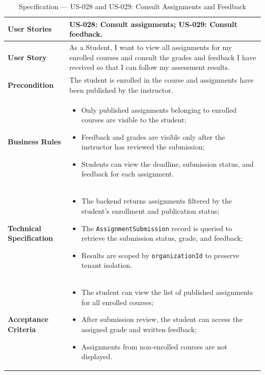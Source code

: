 \begin{table}[H]
\centering
\caption{Specification — US-028 and US-029: Consult Assignments and Feedback}
\label{tab:us028}
\renewcommand{\arraystretch}{1.2}
\begin{tabularx}{\textwidth}{|p{3.5cm}|X|}
\hline
\textbf{User Stories} & US-028: Consult assignments; US-029: Consult feedback. \\
\hline
\textbf{User Story} & As a Student, I want to view all assignments for my enrolled courses and consult the grades and feedback I have received so that I can follow my assessment results. \\
\hline
\textbf{Precondition} & The student is enrolled in the course and assignments have been published by the instructor. \\
\hline
\textbf{Business Rules} &
\begin{itemize}[noitemsep, topsep=2pt]
  \item Only published assignments belonging to enrolled courses are visible to the student;
  \item Feedback and grades are visible only after the instructor has reviewed the submission;
  \item Students can view the deadline, submission status, and feedback for each assignment.
\end{itemize} \\
\hline
\textbf{Technical Specification} &
\begin{itemize}[noitemsep, topsep=2pt]
  \item The backend returns assignments filtered by the student's enrollment and publication status;
  \item The \texttt{AssignmentSubmission} record is queried to retrieve the submission status, grade, and feedback;
  \item Results are scoped by \texttt{organizationId} to preserve tenant isolation.
\end{itemize} \\
\hline
\textbf{Acceptance Criteria} &
\begin{itemize}[noitemsep, topsep=2pt]
  \item The student can view the list of published assignments for all enrolled courses;
  \item After submission review, the student can access the assigned grade and written feedback;
  \item Assignments from non-enrolled courses are not displayed.
\end{itemize} \\
\hline
\end{tabularx}
\end{table}

